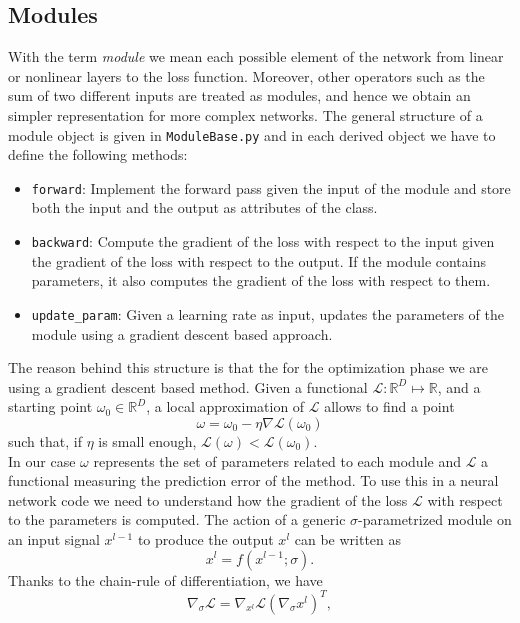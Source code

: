 \documentclass{article}
\begin{document}
\subsection{Modules}
With the term \emph{module} we mean each possible element of the network from linear or nonlinear layers to the loss function. 
Moreover, other operators such as the sum of two different inputs are treated as modules, and hence we obtain an simpler representation for more complex networks.
The general structure of a module object is given in \verb|ModuleBase.py| and in each derived object we have to define the following methods:
\begin{itemize}
\item \verb|forward|: Implement the forward pass given the input of the module and store both the input and the output as attributes of the class. 
\item \verb|backward|: Compute the gradient of the loss with respect to the input given the gradient of the loss with respect to the output. If the module contains parameters, it also computes the gradient of the loss with respect to them.
\item \verb|update_param|: Given a learning rate as input, updates the parameters of the module using a gradient descent based approach.
\end{itemize}
The reason behind this structure is that the for the optimization phase we are using a gradient descent based method. Given a functional $\mathcal{L}:\mathbb{R}^D \mapsto \mathbb{R}$, and a starting point $\omega_0\in\mathbb{R}^D$, a local approximation of $\mathcal{L}$ allows to find a point 
\begin{equation*}
\omega = \omega_0 - \eta \nabla \mathcal{L}(\omega_0)
\end{equation*}
such that, if $\eta$ is small enough, $\mathcal{L}(\omega)<\mathcal{L}(\omega_0)$. \\
In our case $\omega$ represents the set of parameters related to each module and $\mathcal{L}$ a functional measuring the prediction error of the method. To use this in a neural network code we need to understand how the gradient of the loss $\mathcal{L}$ with respect to the parameters is computed. The action of a generic $\sigma$-parametrized module on an input signal $x^{l-1}$ to produce the output  $x^{l}$ can be written as
\begin{equation*}
x^{l} = f( x^{l-1} ; \sigma).
\end{equation*}
Thanks to the chain-rule of differentiation, we have
\begin{equation}\label{gradwrtparam}
\nabla_{\sigma} \mathcal{L} = \nabla_{x^l} \mathcal{L} \left ( \nabla_{\sigma} x^l \right )^T,
\end{equation}
\end{document}
